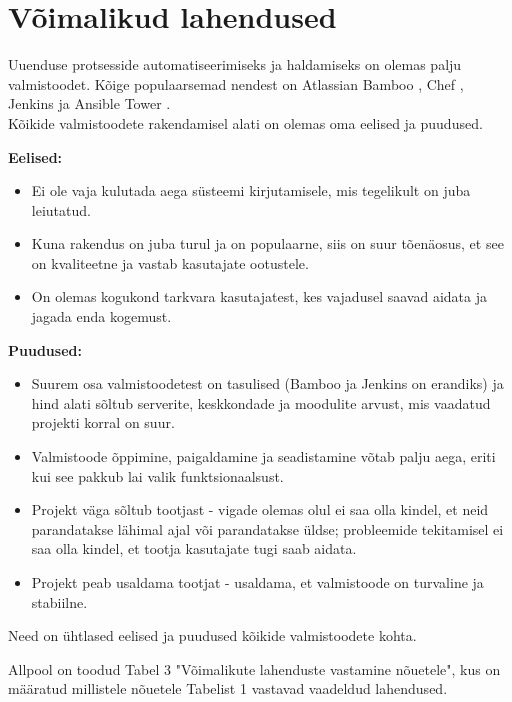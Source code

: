 \documentclass[12pt]{report}
\begin{document}
  \newpage
  
  \section{Võimalikud lahendused}
  
  Uuenduse protsesside automatiseerimiseks ja haldamiseks on olemas palju valmistoodet. Kõige populaarsemad nendest on Atlassian Bamboo \cite{bamboo}, Chef \cite{chef}, Jenkins \cite{jenkins} ja Ansible Tower \cite{ansible}.\\
  
  Kõikide valmistoodete rakendamisel alati on olemas oma eelised ja puudused.
  
  \textbf{Eelised:}
  \begin{itemize}
    \item Ei ole vaja kulutada aega süsteemi kirjutamisele, mis tegelikult on juba leiutatud.
    \item Kuna rakendus on juba turul ja on populaarne, siis on suur tõenäosus, et see on kvaliteetne ja vastab kasutajate ootustele.
    \item On olemas kogukond tarkvara kasutajatest, kes vajadusel saavad aidata ja jagada enda kogemust.
  \end{itemize}
  
  \textbf{Puudused:}
  \begin{itemize}
    \item Suurem osa valmistoodetest on tasulised (Bamboo ja Jenkins on erandiks) ja hind alati sõltub serverite, keskkondade ja moodulite arvust, mis vaadatud projekti korral on suur.
    \item Valmistoode õppimine, paigaldamine ja seadistamine võtab palju aega, eriti kui see pakkub lai valik funktsionaalsust.
    \item Projekt väga sõltub tootjast \-- vigade olemas olul ei saa olla kindel, et neid parandatakse lähimal ajal või parandatakse üldse; probleemide tekitamisel ei saa olla kindel, et tootja kasutajate tugi saab aidata.
    \item Projekt peab usaldama tootjat \-- usaldama, et valmistoode on turvaline ja stabiilne.
  \end{itemize}
  
  Need on ühtlased eelised ja puudused kõikide valmistoodete kohta.
  
  Allpool on toodud Tabel 3 "Võimalikute lahenduste vastamine nõuetele", kus on määratud millistele nõuetele Tabelist 1 vastavad vaadeldud lahendused.
  
\end{document}
